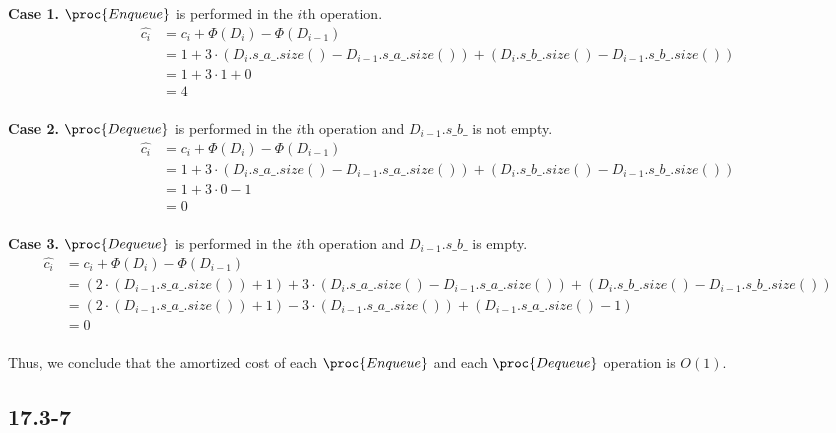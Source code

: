 \textbf{Case 1.} 
$\proc{Enqueue}$ is performed in the $i$th operation.
\begin{equation*}
\begin{split}
    \hat{c_i} & = c_i + \Phi(D_i) - \Phi(D_{i-1}) \\
    & = 1 + 3 \cdot (D_i.s\_a\_.size() - D_{i-1}.s\_a\_.size()) 
        + (D_i.s\_b\_.size() - D_{i-1}.s\_b\_.size())\\
    & = 1 + 3 \cdot 1 + 0 \\
    & = 4 \\
\end{split}
\end{equation*}

\textbf{Case 2.} 
$\proc{Dequeue}$ is performed in the $i$th operation
and $D_{i-1}.s\_b\_$ is not empty.
\begin{equation*}
\begin{split}
    \hat{c_i} & = c_i + \Phi(D_i) - \Phi(D_{i-1}) \\
    & = 1 + 3 \cdot (D_i.s\_a\_.size() - D_{i-1}.s\_a\_.size()) 
        + (D_i.s\_b\_.size() - D_{i-1}.s\_b\_.size())\\
    & = 1 + 3 \cdot 0 - 1 \\
    & = 0 \\
\end{split}
\end{equation*}

\textbf{Case 3.} 
$\proc{Dequeue}$ is performed in the $i$th operation
and $D_{i-1}.s\_b\_$ is empty.
\begin{equation*}
\begin{split}
    \hat{c_i} & = c_i + \Phi(D_i) - \Phi(D_{i-1}) \\
    & = (2 \cdot (D_{i-1}.s\_a\_.size()) + 1)
         + 3 \cdot (D_i.s\_a\_.size() - D_{i-1}.s\_a\_.size()) 
        + (D_i.s\_b\_.size() - D_{i-1}.s\_b\_.size())\\
    & = (2 \cdot (D_{i-1}.s\_a\_.size()) + 1) 
        - 3 \cdot (D_{i-1}.s\_a\_.size()) + (D_{i-1}.s\_a\_.size() - 1) \\
    & = 0 \\
\end{split}
\end{equation*}

Thus, we conclude that the amortized cost of each
$\proc{Enqueue}$ and each $\proc{Dequeue}$ operation
is $O(1)$.

\subsection*{17.3-7}

